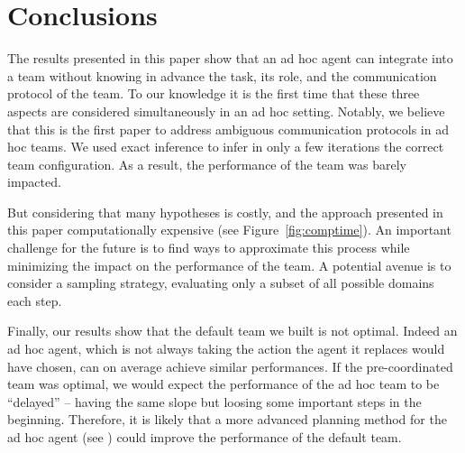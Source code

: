 \section{Conclusions}


The results presented in this paper show that an ad hoc agent can integrate into a team without knowing in advance the task, its role, and the communication protocol of the team. To our knowledge it is the first time that these three aspects are considered simultaneously in an ad hoc setting. Notably, we believe that this is the first paper to address ambiguous communication protocols in ad hoc teams. We used exact inference to infer in only a few iterations the correct team configuration. As a result, the performance of the team was barely impacted.

But considering that many hypotheses is costly, and the approach presented in this paper computationally expensive (see Figure~\ref{fig:comptime}). An important challenge for the future is to find ways to approximate this process while minimizing the impact on the performance of the team. A potential avenue is to consider a sampling strategy, evaluating only a subset of all possible domains each step.

Finally, our results show that the default team we built is not optimal. Indeed an ad hoc agent, which is not always taking the action the agent it replaces would have chosen, can on average achieve similar performances. If the pre-coordinated team was optimal, we would expect the performance of the ad hoc team to be ``delayed'' -- having the same slope but loosing some important steps in the beginning. Therefore, it is likely that a more advanced planning method for the ad hoc agent (see \cite{barrett2011empirical}) could improve the performance of the default team.

